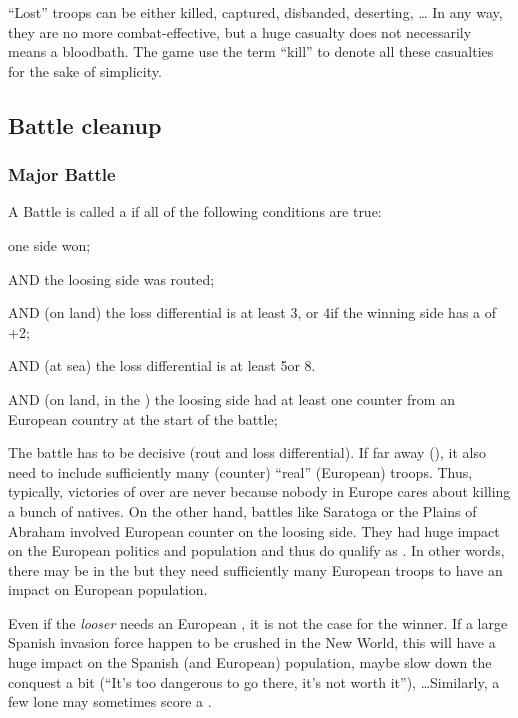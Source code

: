 \begin{designnote}
  ``Lost'' troops can be either killed, captured, disbanded, deserting, \ldots
  In any way, they are no more combat-effective, but a huge casualty does not
  necessarily means a bloodbath. The game use the term ``kill'' to denote all
  these casualties for the sake of simplicity.
\end{designnote}

\subsection{Battle cleanup}
\label{chMilitary:Battle:Cleanup}

\subsubsection{Major Battle}
A Battle is called a  if all of the following conditions
are true:
\begin{modlist}
\item one side won;
\item[AND] the loosing side was routed;
\item[AND] (on land) the loss differential is at least 3\LD, or 4\LD if the
  winning side has a  of +2;
\item[AND] (at sea) the loss differential is at least 5\NWD or 8\NGD.
\item[AND] (on land, in the \ROTW) the loosing side had at least one \ARMY
  counter from an European country at the start of the battle;
\end{modlist}

\begin{designnote}
  The battle has to be decisive (rout and loss differential). If far away
  (\ROTW), it also need to include sufficiently many (\ARMY counter) ``real''
  (European) troops. Thus, typically, victories of \HIS over \paysAzteque are
  never  because nobody in Europe cares about killing a
  bunch of natives. On the other hand, battles like Saratoga or the Plains of
  Abraham involved European \ARMY counter on the loosing side. They had huge
  impact on the European politics and population and thus do qualify as
  . In other words, there may be  in
  the \ROTW but they need sufficiently many European troops to have an impact
  on European population.

  Even if the \emph{looser} needs an European \ARMY, it is not the case for
  the winner. If a large Spanish invasion force happen to be crushed in the
  New World, this will have a huge impact on the Spanish (and European)
  population, maybe slow down the conquest a bit (``It's too dangerous to go
  there, it's not worth it''), \ldots Similarly, a few lone \LD may sometimes
  score a .
\end{designnote}

